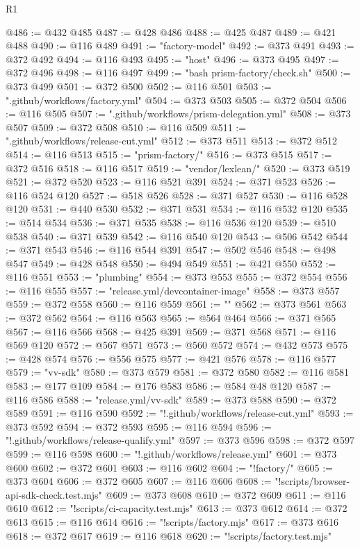 \begin{lexlean}{R1}
\begin{coremodule}
@486 := @432 @485
@487 := @428 @486
@488 := @425 @487
@489 := @421 @488
@490 := @116 @489
@491 := "factory-model"
@492 := @373 @491
@493 := @372 @492
@494 := @116 @493
@495 := "host"
@496 := @373 @495
@497 := @372 @496
@498 := @116 @497
@499 := "bash prism-factory/check.sh"
@500 := @373 @499
@501 := @372 @500
@502 := @116 @501
@503 := ".github/workflows/factory.yml"
@504 := @373 @503
@505 := @372 @504
@506 := @116 @505
@507 := ".github/workflows/prism-delegation.yml"
@508 := @373 @507
@509 := @372 @508
@510 := @116 @509
@511 := ".github/workflows/release-cut.yml"
@512 := @373 @511
@513 := @372 @512
@514 := @116 @513
@515 := "prism-factory/"
@516 := @373 @515
@517 := @372 @516
@518 := @116 @517
@519 := "vendor/lexlean/"
@520 := @373 @519
@521 := @372 @520
@523 := @116 @521 @391
@524 := @371 @523
@526 := @116 @524 @120
@527 := @518 @526
@528 := @371 @527
@530 := @116 @528 @120
@531 := @440 @530
@532 := @371 @531
@534 := @116 @532 @120
@535 := @514 @534
@536 := @371 @535
@538 := @116 @536 @120
@539 := @510 @538
@540 := @371 @539
@542 := @116 @540 @120
@543 := @506 @542
@544 := @371 @543
@546 := @116 @544 @391
@547 := @502 @546
@548 := @498 @547
@549 := @428 @548
@550 := @494 @549
@551 := @421 @550
@552 := @116 @551
@553 := "plumbing"
@554 := @373 @553
@555 := @372 @554
@556 := @116 @555
@557 := "release.yml/devcontainer-image"
@558 := @373 @557
@559 := @372 @558
@560 := @116 @559
@561 := ""
@562 := @373 @561
@563 := @372 @562
@564 := @116 @563
@565 := @564 @464
@566 := @371 @565
@567 := @116 @566
@568 := @425 @391
@569 := @371 @568
@571 := @116 @569 @120
@572 := @567 @571
@573 := @560 @572
@574 := @432 @573
@575 := @428 @574
@576 := @556 @575
@577 := @421 @576
@578 := @116 @577
@579 := "vv-sdk"
@580 := @373 @579
@581 := @372 @580
@582 := @116 @581
@583 := @177 @109
@584 := @176 @583
@586 := @584 @48 @120
@587 := @116 @586
@588 := "release.yml/vv-sdk"
@589 := @373 @588
@590 := @372 @589
@591 := @116 @590
@592 := "!.github/workflows/release-cut.yml"
@593 := @373 @592
@594 := @372 @593
@595 := @116 @594
@596 := "!.github/workflows/release-qualify.yml"
@597 := @373 @596
@598 := @372 @597
@599 := @116 @598
@600 := "!.github/workflows/release.yml"
@601 := @373 @600
@602 := @372 @601
@603 := @116 @602
@604 := "!factory/"
@605 := @373 @604
@606 := @372 @605
@607 := @116 @606
@608 := "!scripts/browser-api-sdk-check.test.mjs"
@609 := @373 @608
@610 := @372 @609
@611 := @116 @610
@612 := "!scripts/ci-capacity.test.mjs"
@613 := @373 @612
@614 := @372 @613
@615 := @116 @614
@616 := "!scripts/factory.mjs"
@617 := @373 @616
@618 := @372 @617
@619 := @116 @618
@620 := "!scripts/factory.test.mjs"

\end{coremodule}
\end{lexlean}

